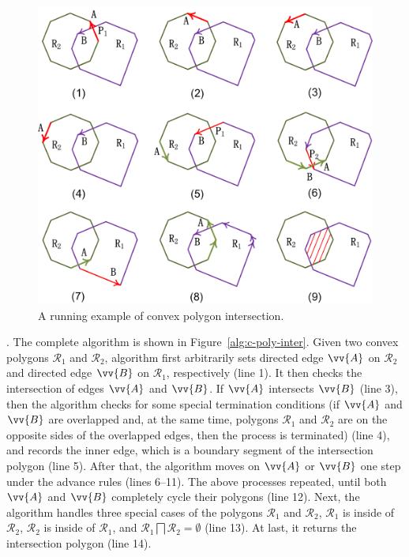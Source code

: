 \begin{figure}[tb!]
	\centering
	\includegraphics[scale=0.92]{figures/Fig-convex-poly-inter.png}
	\caption{\small A running example of convex polygon intersection.}
	\vspace{-1ex}
	\label{fig:c-poly-inter}
\end{figure}


. The complete algorithm is shown in Figure~\ref{alg:c-poly-inter}.
Given two convex polygons $\mathcal{R}_1$ and $\mathcal{R}_2$, algorithm \cpia first arbitrarily sets directed edge $\vv{A}$ on $\mathcal{R}_2$ and directed edge $\vv{B}$ on $\mathcal{R}_1$, respectively (line 1).
%
It then checks the intersection of edges $\vv{A}$ and $\vv{B}$. If $\vv{A}$ intersects $\vv{B}$ (line 3), then the algorithm checks for some special termination conditions (\eg if $\vv{A}$ and $\vv{B}$ are overlapped and, at the same time, polygons $\mathcal{R}_1$ and $\mathcal{R}_2$ are on the opposite sides of the overlapped edges, then the process is terminated) (line 4), and records the inner edge, which is a boundary segment of the intersection polygon (line 5).
After that, the algorithm moves on $\vv{A}$ or $\vv{B}$ one step under the advance rules (lines 6--11).
The above processes repeated, until both $\vv{A}$ and $\vv{B}$ completely cycle their polygons (line 12).
%
Next, the algorithm handles three special cases of the polygons $\mathcal{R}_1$ and $\mathcal{R}_2$, \ie $\mathcal{R}_1$ is inside of $\mathcal{R}_2$, $\mathcal{R}_2$ is inside of $\mathcal{R}_1$, and $\mathcal{R}_1 \bigsqcap \mathcal{R}_2 = \emptyset$ (line 13).
%
At last, it returns the intersection polygon (line 14).





